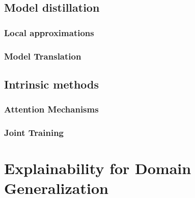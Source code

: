 \subsection{Model distillation}
\subsubsection{Local approximations}
\subsubsection{Model Translation}

\subsection{Intrinsic methods}
\subsubsection{Attention Mechanisms}
\subsubsection{Joint Training}

\section{Explainability for Domain Generalization}

\citep{zunino2020explainable}